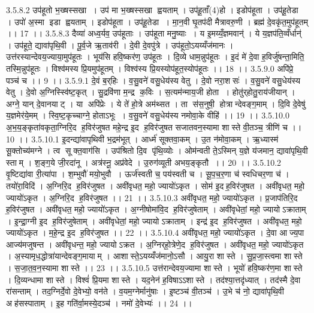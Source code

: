 3.5.8.2
उप॑हूतो भ॒ख्षस्सखा । उप॑ मा भ॒ख्षस्सखा ह्वयताम् । उप॑हू॒ताँ(4)हो । इडोप॑हूता । उप॑हू॒तेडा । उपो॑ अ॒स्मा इडा ह्वयताम् । इडोप॑हूता । उप॑हू॒तेडा । मा॒न॒वी घृ॒तप॑दी मैत्रावरु॒णी । ब्रह्म॑ दे॒वकृ॑त॒मुप॑हूतम् ।। 17 ।।
3.5.8.3
दैव्या॑ अध्व॒र्यव॒ उप॑हूताः । उप॑हूता मनु॒ष्याः । य इ॒मय्यँ॒ज्ञमवान्॑ । ये य॒ज्ञप॑ति॒व्वँर्धान्॑ । उप॑हूते॒ द्यावा॑पृथि॒वी । पू॒र्व॒जे ऋ॒ताव॑री । दे॒वी दे॒वपु॑त्रे । उप॑हूतो॒ऽयय्यँज॑मानः । उत्त॑रस्यान्देवय॒ज्याया॒मुप॑हूतः । भूय॑सि हवि॒ष्कर॑ण॒ उप॑हूतः । दि॒व्ये धाम॒न्नुप॑हूतः । इ॒दं मे॑ दे॒वा ह॒विर्जु॑षन्ता॒मिति॒ तस्मि॒न्नुप॑हूतः । विश्व॑मस्य प्रि॒यमुप॑हूतम् । विश्व॑स्य प्रि॒यस्योप॑हूत॒स्योप॑हूतः ।। 18 ।।
3.5.9.0
अपि॑प्रे॒ पञ्च॑ च ।। 9 ।।
3.5.9.1
दे॒वं ब॒र्‌हिः । व॒सु॒वने॑ वसु॒धेय॑स्य वेतु । दे॒वो नरा॒शसः॑ । व॒सु॒वने॑ वसु॒धेय॑स्य वेतु । दे॒वो अ॒ग्निस्स्वि॑ष्ट॒कृत् । सु॒द्रवि॑णा म॒न्द्र क॒विः । स॒त्यम॑न्माय॒जी होता । होतु॑र्‌होतु॒राय॑जीयान् । अग्ने॒ यान् दे॒वानयाट् । या अपि॑प्रेः । ये ते॑ हो॒त्रे अम॑थ्सत । ता स॑स॒नुषी॒॒ होत्रान्देवङ्ग॒माम् । दि॒वि दे॒वेषु॑ य॒ज्ञमेर॑ये॒मम् । स्वि॒ष्ट॒कृच्चाग्ने॒ होताऽभूः । व॒सु॒वने॑ वसु॒धेय॑स्य नमोवा॒के वीहि॑ ।। 19 ।।
3.5.10.0
अ॒भ॒य॒ङ्कृता॑वकृता॒ग्निरि॒द ह॒विर॑जुषत महे॒न्द्र इ॒द ह॒विर॑जुषत सजातवन॒स्यामा शास्ते वी॒तञ्च॒ त्रीणि॑ च ।। 10 ।।
3.5.10.1
इ॒दन्द्या॑वापृथिवी भ॒द्रम॑भूत् । आर्ध्म॑ सूक्तवा॒कम् । उ॒त न॑मोवा॒कम् । ऋ॒ध्यास्म॑ सू॒क्तोच्य॑मग्ने । त्व सूक्त॒वाग॑सि । उप॑श्रितो दि॒व पृ॑थि॒व्योः । ओम॑न्वती ते॒ऽस्मिन् य॒ज्ञे य॑जमान॒ द्यावा॑पृथि॒वी स्ताम् । श॒ङ्ग॒ये जी॒रदा॑नू । अत्र॑स्नू॒ अप्र॑वेदे । उ॒रुग॑व्यूती अभय॒ङ्कृतौ ।। 20 ।।
3.5.10.2
वृ॒ष्टिद्या॑वा री॒त्या॑पा । श॒म्भुवौ॑ मयो॒भुवौ । ऊर्ज॑स्वती च॒ पय॑स्वती च । सू॒प॒च॒र॒णा च॑ स्वधिचर॒णा च॑ । तयो॑रा॒विदि॑ । अ॒ग्निरि॒द ह॒विर॑जुषत । अवी॑वृधत॒ महो॒ ज्यायो॑ऽकृत । सोम॑ इ॒दह॒विर॑जुषत । अवी॑वृधत॒ महो॒ ज्यायो॑ऽकृत । अ॒ग्निरि॒द ह॒विर॑जुषत ।। 21 ।।
3.5.10.3
अवी॑वृधत॒ महो॒ ज्यायो॑ऽकृत । प्र॒जाप॑तिरि॒द ह॒विर॑जुषत । अवी॑वृधत॒ महो॒ ज्यायो॑ऽकृत । अ॒ग्नीषोमा॑वि॒द ह॒विर॑जुषेताम् । अवी॑वृधेतां॒ महो॒ ज्यायोऽक्राताम् । इ॒न्द्रा॒ग्नी इ॒द ह॒विर॑जुषेताम् । अवी॑वृधेतां॒ महो॒ ज्यायोऽक्राताम् । इन्द्र॑ इ॒द ह॒विर॑जुषत । अवी॑वृधत॒ महो॒ ज्यायो॑ऽकृत । म॒हे॒न्द्र इ॒द ह॒विर॑जुषत ।। 22 ।।
3.5.10.4
अवी॑वृधत॒ महो॒ ज्यायो॑ऽकृत । दे॒वा आज्य॒पा आज्य॑मजुषन्त । अवी॑वृधन्त॒ महो॒ ज्यायोऽक्रत । अ॒ग्निर्‌हो॒त्रेणे॒द ह॒विर॑जुषत । अवी॑वृधत॒ महो॒ ज्यायो॑ऽकृत । अ॒स्यामृध॒द्धोत्रा॑यान्देवङ्ग॒मायाम् । आशास्ते॒ऽयय्यँज॑मानो॒ऽसौ । आयु॒रा शास्ते । सु॒प्र॒जा॒स्त्वमा शास्ते । स॒जा॒त॒व॒न॒स्यामा शास्ते ।। 23 ।।
3.5.10.5
उत्त॑रान्देवय॒ज्यामा शास्ते । भूयो॑ हवि॒ष्कर॑ण॒मा शास्ते । दि॒व्यन्धामा शास्ते । विश्वं॑ प्रि॒यमा शास्ते । यद॒नेन॑ ह॒विषाऽऽशास्ते । तद॑श्या॒त्तदृ॑ध्यात् । तद॑स्मै दे॒वा रा॑सन्ताम् । तद॒ग्निर्दे॒वो दे॒वेभ्यो॒ वन॑ते । व॒यम॒ग्नेर्मानु॑षाः । इ॒ष्टञ्च॑ वी॒तञ्च॑ । उ॒भे च॑ नो॒ द्यावा॑पृथि॒वी अह॑सस्पाताम् । इ॒ह गति॑र्वा॒मस्ये॒दञ्च॑ । नमो॑ दे॒वेभ्यः॑ ।। 24 ।।
